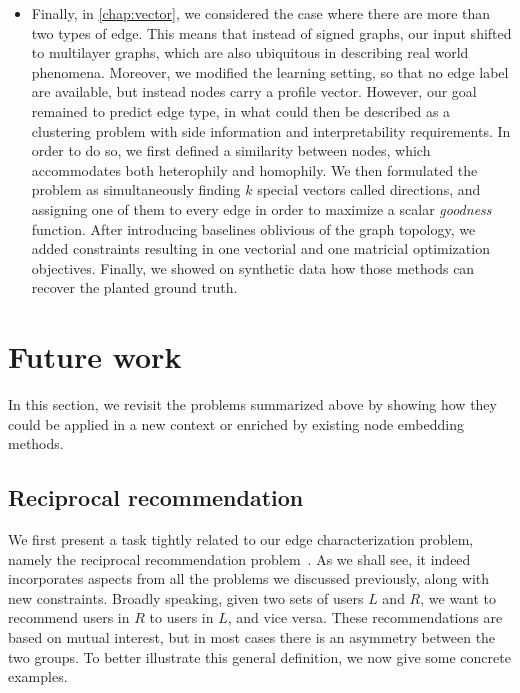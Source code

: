 \begin{itemize}
  \item Finally, in \autoref{chap:vector}, we considered the case where there are more than two types
    of edge. This means that instead of signed graphs, our input shifted to multilayer graphs, which
    are also ubiquitous in describing real world phenomena. Moreover, we modified the learning
    setting, so that no edge label are available, but instead nodes carry a profile vector. However,
    our goal remained to predict edge type, in what could then be described as a clustering problem
    with side information and interpretability requirements. In order to do so, we first defined a
    similarity between nodes, which accommodates both heterophily and homophily. We then formulated
    the problem as simultaneously finding $k$ special vectors called directions, and assigning one
    of them to every edge in order to maximize a scalar \emph{goodness} function. After introducing
    baselines oblivious of the graph topology, we added constraints resulting in one vectorial and
    one matricial optimization objectives. Finally, we showed on synthetic data how those methods
    can recover the planted ground truth.

\end{itemize}

\section{Future work}

In this section, we revisit the problems summarized above by showing how they could be applied in a
new context or enriched by existing node embedding methods.

\subsection{Reciprocal recommendation}
\label{ssec:conc_rr}

We first present a task tightly related to our edge characterization problem, namely the reciprocal
recommendation problem~\autocite{Pizzato2013}. As we shall see, it indeed incorporates aspects from
all the problems we discussed previously, along with new constraints. Broadly speaking,
given two sets of users $L$ and $R$, we want to recommend users in $R$ to users in $L$, and vice
versa. These recommendations are based on mutual interest, but in most cases there is an asymmetry
between the two groups. To better illustrate this general definition, we now give some concrete
examples.

